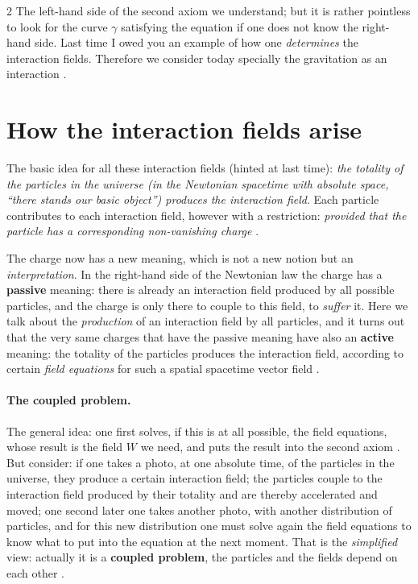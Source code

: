 \begin{paracol}{2}
The left-hand side of the second axiom we understand; but it is rather pointless to look for the curve $\gamma$ satisfying the equation if one does not know the right-hand side. Last time I owed you an example of how one \emph{determines} the interaction fields. Therefore we consider today specially the gravitation as an interaction .

\section{How the interaction fields arise}\label{sec:ng-origin}

The basic idea for all these interaction fields (hinted at last time): \emph{the totality of the particles in the universe (in the Newtonian spacetime with absolute space, ``there stands our basic object'') produces the interaction field}. Each particle contributes to each interaction field, however with a restriction:
\emph{provided that the particle has a corresponding non-vanishing charge} .

\begin{intuition}\label{int:ng-active}
The charge now has a new meaning, which is not a new notion but an \emph{interpretation}. In the right-hand side of the Newtonian law the charge has a \textbf{passive} meaning: there is already an interaction field produced by all possible particles, and the charge is only there to couple to this field, to \emph{suffer} it.
Here we talk about the \emph{production} of an interaction field by all particles, and it turns out that the very same charges that have the passive meaning have also an \textbf{active} meaning: the totality of the particles produces the interaction field, according to certain \emph{field equations} for such a spatial spacetime vector field .
\end{intuition}

\paragraph{The coupled problem.} The general idea: one first solves, if this is at all possible, the field equations, whose result is the field $W$ we need, and puts the result into the second axiom . But consider: if one takes a photo, at one absolute time, of the particles in the universe, they produce a certain interaction field; the particles couple to the interaction field produced by their totality and are thereby accelerated and moved;
one second later one takes another photo, with another distribution of particles, and for this new distribution one must solve again the field equations to know what to put into the equation at the next moment. That is the \emph{simplified} view: actually it is a \textbf{coupled problem}, the particles and the fields depend on each other .


\end{paracol}
